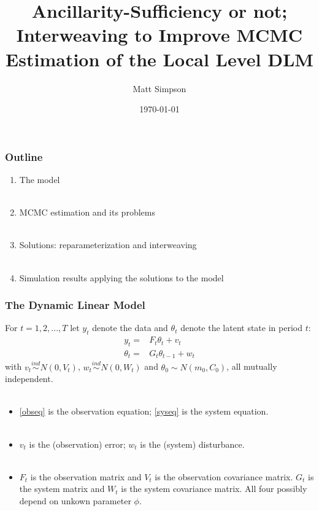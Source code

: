 \documentclass[xcolor=dvipsnames]{beamer}\usepackage{graphicx, color}
\title[DLM Interweaving]{Ancillarity-Sufficiency or not; Interweaving to Improve MCMC Estimation of the Local Level DLM}
\author[Matt Simpson]{Matt Simpson}
\date{\today}
\institute[Dep. of Statistics, ISU]{Department of Statistics, Iowa State University}
\begin{document}
\begin{frame}
\titlepage
\end{frame}

\begin{frame}
  \frametitle{Outline}
  \begin{enumerate}
    \item The model\\~\\
    \item MCMC estimation and its problems\\~\\
    \item Solutions: reparameterization and interweaving\\~\\
    \item Simulation results applying the solutions to the model
  \end{enumerate}
\end{frame}

\begin{frame}
  \frametitle{The Dynamic Linear Model} 
  For $t=1,2,...,T$ let $y_t$ denote the data and $\theta_t$ denote the latent state in period $t$:
  \begin{align}
    y_t  =&F_t\theta_t +  v_t\label{obseq}\\
    \theta_t =& G_t\theta_{t-1} + w_t\label{syseq}
  \end{align} 
  with $v_t\stackrel{ind}{\sim}N(0,V_t)$, $w_t\stackrel{ind}{\sim}N(0,W_t)$ and $\theta_0\sim N(m_0,C_0)$, all mutually independent.\\~\\
  \begin{itemize}%
  \item \eqref{obseq} is the observation equation; \eqref{syseq} is the system equation. \\~\\
  \item $v_t$ is the (observation) error; $w_t$ is the (system) disturbance. \\~\\
  \item $F_t$ is the observation matrix and $V_t$ is the observation covariance matrix. $G_t$ is the system matrix and  $W_t$ is the system covariance matrix. All four possibly depend on unkown parameter $\phi$.
  \end{itemize}
\end{frame}
\end{document}
